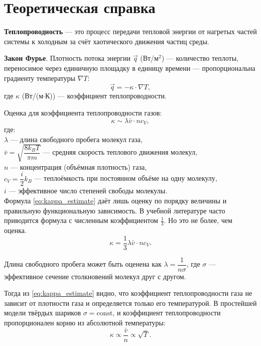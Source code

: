 \documentclass[a4paper,12pt]{article} %
\begin{document}
\section*{Теоретическая справка}

\textbf{Теплопроводность} — это процесс передачи тепловой энергии от нагретых частей системы к холодным за счёт хаотического движения частиц среды. 

\textbf{Закон Фурье}. Плотность потока энергии $\vec{q}$ (Вт/м$^2$) — количество теплоты, переносимое через единичную площадку в единицу времени — пропорциональна градиенту температуры $\nabla T$:
\begin{equation}
    \vec{q} = -\kappa \cdot \nabla T, \label{eq:fourier}
\end{equation}
где $\kappa$ (Вт/(м$\cdot$К)) — коэффициент теплопроводности.

Оценка для коэффициента теплопроводности газов:
\begin{equation}
    \kappa \sim \lambda \bar{v} \cdot n c_V, \label{eq:kappa_estimate}
\end{equation}
где:\\ 
$\lambda$ — длина свободного пробега молекул газа,\\
$\bar{v} = \sqrt{\dfrac{8k_B T}{\pi m}}$ — средняя скорость теплового движения молекул, \\
$n$ — концентрация (объёмная плотность) газа, \\
$c_V = \dfrac{i}{2}k_B$ — теплоёмкость при постоянном объёме на одну молекулу, \\
$i$ — эффективное число степеней свободы молекулы. \\

Формула \eqref{eq:kappa_estimate} даёт лишь оценку по порядку величины и правильную функциональную зависимость. В учебной литературе часто приводится формула с численным коэффициентом $\frac{1}{3}$. Но это не более, чем оценка. 
\[
    \kappa = \frac{1}{3} \lambda \bar{v} \cdot n c_V.
\]

Длина свободного пробега может быть оценена как $\lambda = \dfrac{1}{n \sigma}$, где $\sigma$ — эффективное сечение столкновений молекул друг с другом.

Тогда из \eqref{eq:kappa_estimate} видно, что коэффициент теплопроводности газа не зависит от плотности газа и определяется только его температурой. В простейшей модели твёрдых шариков $\sigma = \text{const}$, и коэффициент теплопроводности пропорционален корню из абсолютной температуры:
\[
    \kappa \propto \frac{\bar{v}}{n} \propto \sqrt{T}.
\]
\end{document}
